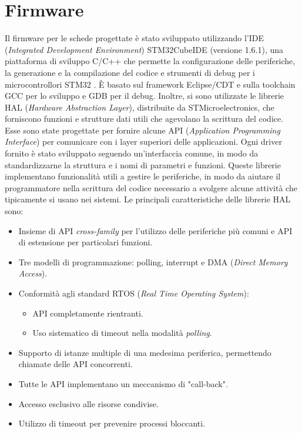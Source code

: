 \section{Firmware}\label{sec:Firmware}
Il firmware per le schede progettate è stato sviluppato utilizzando l'IDE (\textit{Integrated Development Environment}) STM32CubeIDE (versione 1.6.1), una piattaforma di sviluppo C/C++ che permette la configurazione delle periferiche, la generazione e la compilazione del codice e strumenti di debug per i microcontrollori STM32 \cite{STMicroelectronicsSTM32CubeIDE}. \`E basato sul framework Eclipse\textregistered/CDT e sulla toolchain GCC per lo sviluppo e GDB per il debug. Inoltre, si sono utilizzate le librerie HAL (\textit{Hardware Abstraction Layer}), distribuite da STMicroelectronics, che forniscono funzioni e strutture dati utili che agevolano la scrittura del codice. Esse sono state progettate per fornire alcune API (\textit{Application Programming Interface}) per comunicare con i layer superiori delle applicazioni\cite{STMicroelectronicsHAL}. Ogni driver fornito è stato sviluppato seguendo un'interfaccia comune, in modo da standardizzarne la struttura e i nomi di parametri e funzioni. Queste librerie implementano funzionalità utili a gestire le periferiche, in modo da aiutare il programmatore nella scrittura del codice necessario a svolgere alcune attività che tipicamente si usano nei sistemi.
Le principali caratteristiche delle librerie HAL sono:
\begin{itemize}
	\item Insieme di API \textit{cross-family} per l'utilizzo delle periferiche più comuni e API di estensione per particolari funzioni.
	\item Tre modelli di programmazione: polling, interrupt e DMA (\textit{Direct Memory Access}).
	\item Conformità agli standard RTOS (\textit{Real Time Operating System}):
	\begin{itemize}
		\item API completamente rientranti.
		\item Uso sistematico di timeout nella modalità \textit{polling}.
	\end{itemize}
	\item Supporto di istanze multiple di una medesima periferica, permettendo chiamate delle API concorrenti.
	\item Tutte le API implementano un meccanismo di "call-back".
	\item Accesso esclusivo alle risorse condivise.
	\item Utilizzo di timeout per prevenire processi bloccanti.
\end{itemize}

